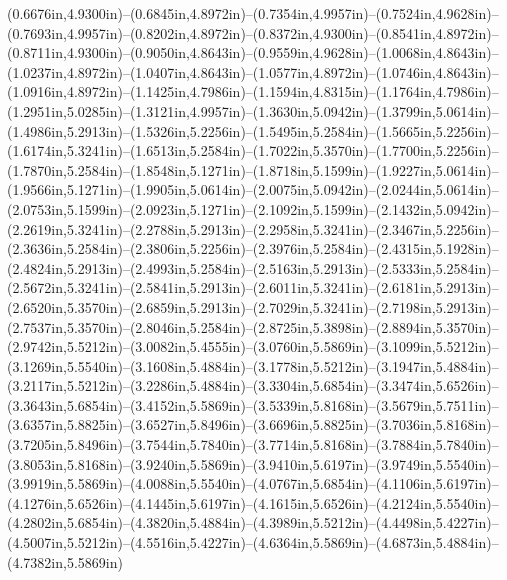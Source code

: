 (0.6676in,4.9300in)--(0.6845in,4.8972in)--(0.7354in,4.9957in)--(0.7524in,4.9628in)--(0.7693in,4.9957in)--(0.8202in,4.8972in)--(0.8372in,4.9300in)--(0.8541in,4.8972in)--(0.8711in,4.9300in)--(0.9050in,4.8643in)--(0.9559in,4.9628in)--(1.0068in,4.8643in)--(1.0237in,4.8972in)--(1.0407in,4.8643in)--(1.0577in,4.8972in)--(1.0746in,4.8643in)--(1.0916in,4.8972in)--(1.1425in,4.7986in)--(1.1594in,4.8315in)--(1.1764in,4.7986in)--(1.2951in,5.0285in)--(1.3121in,4.9957in)--(1.3630in,5.0942in)--(1.3799in,5.0614in)--(1.4986in,5.2913in)--(1.5326in,5.2256in)--(1.5495in,5.2584in)--(1.5665in,5.2256in)--(1.6174in,5.3241in)--(1.6513in,5.2584in)--(1.7022in,5.3570in)--(1.7700in,5.2256in)--(1.7870in,5.2584in)--(1.8548in,5.1271in)--(1.8718in,5.1599in)--(1.9227in,5.0614in)--(1.9566in,5.1271in)--(1.9905in,5.0614in)--(2.0075in,5.0942in)--(2.0244in,5.0614in)--(2.0753in,5.1599in)--(2.0923in,5.1271in)--(2.1092in,5.1599in)--(2.1432in,5.0942in)--(2.2619in,5.3241in)--(2.2788in,5.2913in)--(2.2958in,5.3241in)--(2.3467in,5.2256in)--(2.3636in,5.2584in)--(2.3806in,5.2256in)--(2.3976in,5.2584in)--(2.4315in,5.1928in)--(2.4824in,5.2913in)--(2.4993in,5.2584in)--(2.5163in,5.2913in)--(2.5333in,5.2584in)--(2.5672in,5.3241in)--(2.5841in,5.2913in)--(2.6011in,5.3241in)--(2.6181in,5.2913in)--(2.6520in,5.3570in)--(2.6859in,5.2913in)--(2.7029in,5.3241in)--(2.7198in,5.2913in)--(2.7537in,5.3570in)--(2.8046in,5.2584in)--(2.8725in,5.3898in)--(2.8894in,5.3570in)--(2.9742in,5.5212in)--(3.0082in,5.4555in)--(3.0760in,5.5869in)--(3.1099in,5.5212in)--(3.1269in,5.5540in)--(3.1608in,5.4884in)--(3.1778in,5.5212in)--(3.1947in,5.4884in)--(3.2117in,5.5212in)--(3.2286in,5.4884in)--(3.3304in,5.6854in)--(3.3474in,5.6526in)--(3.3643in,5.6854in)--(3.4152in,5.5869in)--(3.5339in,5.8168in)--(3.5679in,5.7511in)--(3.6357in,5.8825in)--(3.6527in,5.8496in)--(3.6696in,5.8825in)--(3.7036in,5.8168in)--(3.7205in,5.8496in)--(3.7544in,5.7840in)--(3.7714in,5.8168in)--(3.7884in,5.7840in)--(3.8053in,5.8168in)--(3.9240in,5.5869in)--(3.9410in,5.6197in)--(3.9749in,5.5540in)--(3.9919in,5.5869in)--(4.0088in,5.5540in)--(4.0767in,5.6854in)--(4.1106in,5.6197in)--(4.1276in,5.6526in)--(4.1445in,5.6197in)--(4.1615in,5.6526in)--(4.2124in,5.5540in)--(4.2802in,5.6854in)--(4.3820in,5.4884in)--(4.3989in,5.5212in)--(4.4498in,5.4227in)--(4.5007in,5.5212in)--(4.5516in,5.4227in)--(4.6364in,5.5869in)--(4.6873in,5.4884in)--(4.7382in,5.5869in) 